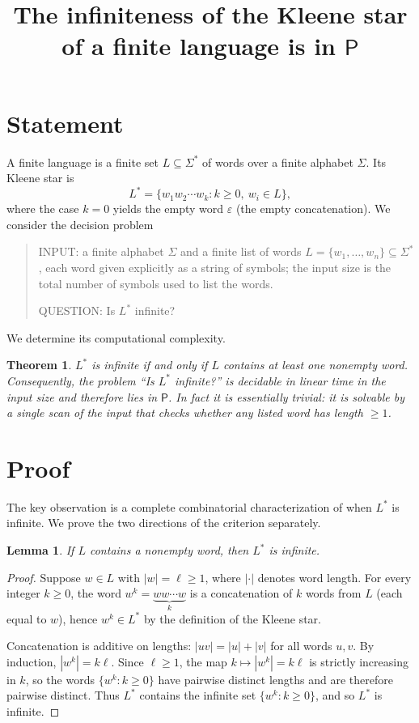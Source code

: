 \documentclass{amsart}
\newtheorem{theorem}{Theorem}
\newtheorem{lemma}{Lemma}
\theoremstyle{definition}
\begin{document}
\title{The infiniteness of the Kleene star of a finite language is in $\mathsf{P}$}
\maketitle

\section{Statement}

A finite language is a finite set $L \subseteq \Sigma^*$ of words over a finite
alphabet $\Sigma$. Its Kleene star is
\[
L^* = \{w_1 w_2 \cdots w_k : k \ge 0,\ w_i \in L\},
\]
where the case $k=0$ yields the empty word $\varepsilon$ (the empty concatenation).
We consider the decision problem

\begin{quote}
INPUT: a finite alphabet $\Sigma$ and a finite list of words
$L = \{w_1,\dots,w_n\} \subseteq \Sigma^*$, each word given explicitly as a string
of symbols; the input size is the total number of symbols used to list the words.

QUESTION: Is $L^*$ infinite?
\end{quote}

We determine its computational complexity.

\begin{theorem}\label{thm:main}
$L^*$ is infinite if and only if $L$ contains at least one nonempty word.
Consequently, the problem ``Is $L^*$ infinite?'' is decidable in linear time
in the input size and therefore lies in $\mathsf{P}$. In fact it is essentially
trivial: it is solvable by a single scan of the input that checks whether any
listed word has length $\ge 1$.
\end{theorem}

\section{Proof}

The key observation is a complete combinatorial characterization of when $L^*$
is infinite. We prove the two directions of the criterion separately.

\begin{lemma}\label{lem:suff}
If $L$ contains a nonempty word, then $L^*$ is infinite.
\end{lemma}

\begin{proof}
Suppose $w \in L$ with $|w| = \ell \ge 1$, where $|\cdot|$ denotes word length.
For every integer $k \ge 0$, the word $w^k = \underbrace{w w \cdots w}_{k}$ is a
concatenation of $k$ words from $L$ (each equal to $w$), hence $w^k \in L^*$ by
the definition of the Kleene star.

Concatenation is additive on lengths: $|uv| = |u| + |v|$ for all words $u,v$.
By induction, $|w^k| = k\ell$. Since $\ell \ge 1$, the map $k \mapsto |w^k| = k\ell$
is strictly increasing in $k$, so the words $\{w^k : k \ge 0\}$ have pairwise
distinct lengths and are therefore pairwise distinct. Thus $L^*$ contains the
infinite set $\{w^k : k \ge 0\}$, and so $L^*$ is infinite.
\end{proof}
\end{document}
